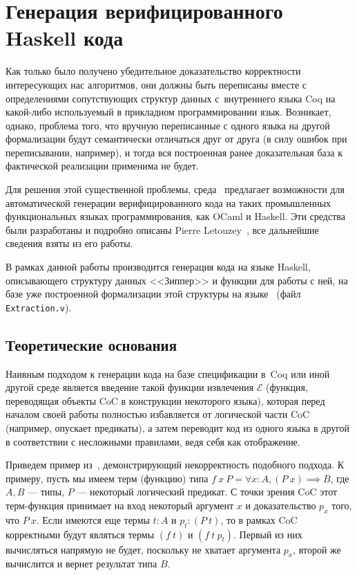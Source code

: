 \section{Генерация верифицированного Haskell кода}

Как только было получено убедительное доказательство корректности интересующих нас алгоритмов, они должны быть переписаны вместе с определениями сопутствующих структур данных с~внутреннего языка Coq на какой-либо используемый в прикладном программировании язык. Возникает, однако, проблема того, что вручную переписанные с одного языка на другой формализации будут семантически отличаться друг от друга (в силу ошибок при переписывании, например), и тогда вся построенная ранее доказательная база к фактической реализации применима не будет. 

Для решения этой существенной проблемы, среда \tcoq~предлагает возможности для автоматической генерации верифицированного кода на таких промышленных функциональных языках программирования, как OCaml и Haskell. Эти средства были разработаны и подробно описаны Pierre Letouzey~\autocite{Pierre2004}, все дальнейшие сведения взяты из его работы.

В рамках данной работы производится генерация кода на языке Haskell, описывающего структуру данных <<Зиппер>> и функции для работы с ней, на базе уже построенной формализации этой структуры на языке \tcoq~(файл \texttt{Extraction.v}).

\subsection{Теоретические основания}
Наивным подходом к генерации кода на базе спецификации в~Coq или иной другой среде является введение такой функции извлечения $\mathcal{E}$ (функция, переводящая объекты CoC в конструкции некоторого языка), которая перед началом своей работы полностью избавляется от логической части CoC (например, опускает предикаты), а затем переводит код из одного языка в другой в соответствии с несложными правилами, ведя себя как отображение.

Приведем пример из~\autocite{Pierre2004}, демонстрирующий некорректность подобного подхода. К примеру, пусть мы имеем терм (функцию) типа $f\ x\ P = \forall x : A, (P\ x) \implies B$, где $A, B$ --- типы, $P$ --- некоторый логический предикат. С точки зрения CoC этот терм-функция принимает на вход некоторый аргумент $x$ и доказательство $p_x$ того, что $P\ x$. Если имеются еще термы $t:A$ и $p_t:(P\ t)$, то в рамках CoC корректными будут являться термы $(f\ t)$ и $(f\ t\ p_t)$. Первый из них вычисляться напрямую не будет, поскольку не хватает аргумента $p_x$, второй же вычислится и вернет результат типа $B$.

